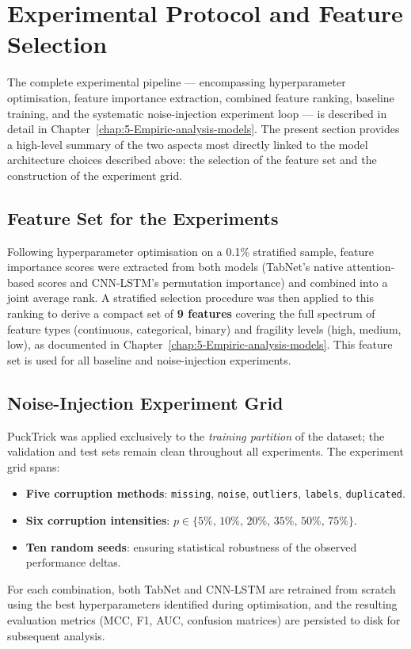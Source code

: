 \documentclass[../main.tex]{subfiles}
\begin{document}
\newpage
\section{Experimental Protocol and Feature Selection}
\label{sec:exp-protocol-features}

The complete experimental pipeline — encompassing hyperparameter optimisation, feature importance extraction, combined feature ranking, baseline training, and the systematic noise-injection experiment loop — is described in detail in Chapter~\ref{chap:5-Empiric-analysis-models}.  The present section provides a high-level summary of the two aspects most directly linked to the model architecture choices described above: the selection of the feature set and the construction of the experiment grid.

\subsection{Feature Set for the Experiments}
\label{sec:feature-set-summary}

Following hyperparameter optimisation on a 0.1\% stratified sample, feature importance scores were extracted from both models (TabNet's native attention-based scores and CNN-LSTM's permutation importance) and combined into a joint average rank.  A stratified selection procedure was then applied to this ranking to derive a compact set of \textbf{9 features} covering the full spectrum of feature types (continuous, categorical, binary) and fragility levels (high, medium, low), as documented in Chapter~\ref{chap:5-Empiric-analysis-models}.  This feature set is used for all baseline and noise-injection experiments.

\subsection{Noise-Injection Experiment Grid}
\label{sec:exp-grid-summary}

PuckTrick was applied exclusively to the \emph{training partition} of the dataset; the validation and test sets remain clean throughout all experiments.  The experiment grid spans:
\begin{itemize}
    \item \textbf{Five corruption methods}: \texttt{missing}, \texttt{noise}, \texttt{outliers}, \texttt{labels}, \texttt{duplicated}.
    \item \textbf{Six corruption intensities}: $p \in \{5\%,\,10\%,\,20\%,\,35\%,\,50\%,\,75\%\}$.
    \item \textbf{Ten random seeds}: ensuring statistical robustness of the observed performance deltas.
\end{itemize}

For each combination, both TabNet and CNN-LSTM are retrained from scratch using the best hyperparameters identified during optimisation, and the resulting evaluation metrics (MCC, F1, AUC, confusion matrices) are persisted to disk for subsequent analysis.
\end{document}

